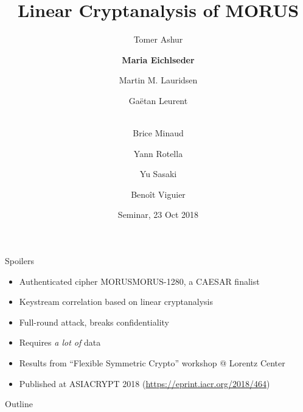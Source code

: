 \documentclass[aspectratio=169,table]{beamer}
\newcommand{\itemwrap}[1]{\parbox{1cm}{\centering #1}}
\newcommand{\cipher}[1]{\textsc{#1}}
\newcommand{\MORUS}[1][]{\ifx\relax#1\relax\cipher{MORUS}\else\cipher{MORUS-#1}\fi\xspace}
\begin{document}
\title[]{Linear Cryptanalysis of MORUS}
\author{Tomer Ashur \and \textbf{Maria Eichlseder} \and Martin M. Lauridsen \and Ga\"etan Leurent \and \\Brice Minaud \and Yann Rotella \and Yu Sasaki \and Beno\^it Viguier}
\date{Seminar, 23 Oct 2018}

\begin{frame}%
  \maketitle
\end{frame}%

\begin{frame}{Spoilers}%
  \begin{itemize}
    \item Authenticated cipher \MORUS[1280], a CAESAR finalist
  \end{itemize}
  \begin{itemize}
    \item Keystream correlation based on linear cryptanalysis
    \item Full-round attack, breaks confidentiality
    \item Requires \textit{a lot of} data %
  \end{itemize}
  \begin{itemize}
    \item Results from ``Flexible Symmetric Crypto'' workshop @ Lorentz Center
    \item Published at ASIACRYPT 2018 (\url{https://eprint.iacr.org/2018/464})
  \end{itemize}
\end{frame}%

\begin{frame}{\itemwrap{\faMapSigns} Outline}%
  \tableofcontents
\end{frame}%
\end{document}
